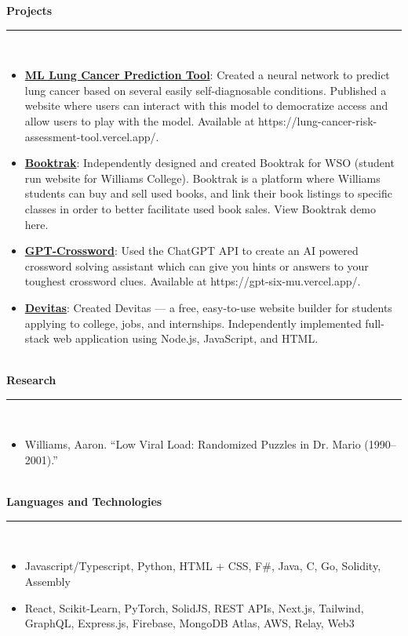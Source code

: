\documentclass[10pt]{article}
\begin{document}
\textbf{Projects}\\[-2ex]
\rule{\textwidth}{0.4pt}\\ 
\vspace{-\baselineskip}
\begin{itemize}[itemsep=0pt, topsep=0pt]
\item \textbf{\underline{ML Lung Cancer Prediction Tool}}: Created a neural network to predict lung cancer based on several easily self-diagnosable conditions. Published a website where users can interact with this model to democratize access and allow users to play with the model. Available at https://lung-cancer-risk-assessment-tool.vercel.app/.
\item \textbf{\underline{Booktrak}}: Independently designed and created Booktrak for WSO (student run website for Williams College). Booktrak is a platform where Williams students can buy and sell used books, and link their book listings to specific classes in order to better facilitate used book sales. View Booktrak demo here.
\item \textbf{\underline{GPT-Crossword}}: Used the ChatGPT API to create an AI powered crossword solving assistant which can give you hints or answers to your toughest crossword clues. Available at https://gpt-six-mu.vercel.app/.
\item \textbf{\underline{Devitas}}: Created Devitas — a free, easy-to-use website builder for students applying to college, jobs, and internships. Independently implemented full-stack web application using Node.js, JavaScript, and HTML.
\end{itemize}~\\[-1ex]
\textbf{Research}\\[-2ex]
\rule{\textwidth}{0.4pt}\\ 
\vspace{-\baselineskip}
\begin{itemize}[itemsep=0pt, topsep=0pt]
\item Williams, Aaron. “Low Viral Load: Randomized Puzzles in Dr. Mario (1990–2001).”
\end{itemize}~\\[-1ex]
\textbf{Languages and Technologies}\\[-2ex]
\rule{\textwidth}{0.4pt}\\ 
\vspace{-\baselineskip}
\begin{itemize}[itemsep=0pt, topsep=0pt]
\item Javascript/Typescript, Python, HTML + CSS, F\#, Java, C, Go, Solidity, Assembly
\item React, Scikit-Learn, PyTorch, SolidJS, REST APIs, Next.js, Tailwind, GraphQL, Express.js, Firebase, MongoDB Atlas, AWS, Relay, Web3
\end{itemize}
\end{document}
